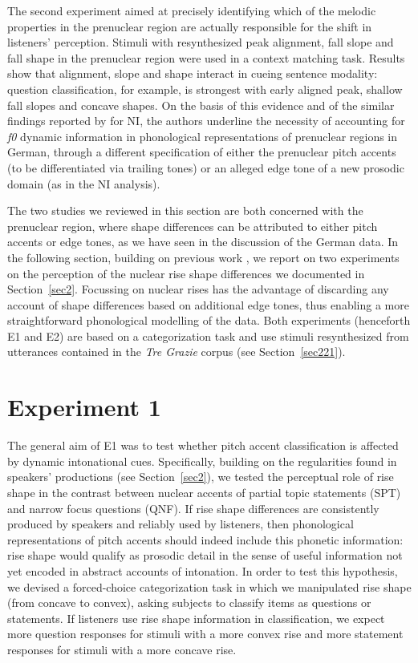 The second experiment aimed at precisely identifying which of the melodic properties in the prenuclear region are actually responsible for the shift in listeners' perception. Stimuli with resynthesized peak alignment, fall slope and fall shape in the prenuclear region were used in a context matching task. Results show that alignment, slope and shape interact in cueing sentence modality: question classification, for example, is strongest with early aligned peak, shallow fall slopes and concave shapes. On the basis of this evidence and of the similar findings reported by \citet{petrone2011tones} for NI, the authors underline the necessity of accounting for \textit{f0} dynamic information in phonological representations of prenuclear regions in German, through a different specification of either the prenuclear pitch accents (to be differentiated via trailing tones) or an alleged edge tone of a new prosodic domain (as in the NI analysis).

The two studies we reviewed in this section are both concerned with the prenuclear region, where shape differences can be attributed to either pitch accents or edge tones, as we have seen in the discussion of the German data. In the following section, building on previous work \citep{dimperio2009interplay}, we report on two experiments on the perception of the nuclear rise shape differences we documented in Section~\ref{sec2}. Focussing on nuclear rises has the advantage of discarding any account of shape differences based on additional edge tones, thus enabling a more straightforward phonological modelling of the data. Both experiments (henceforth E1 and E2) are based on a categorization task and use stimuli resynthesized from utterances contained in the \textit{Tre Grazie} corpus (see Section~\ref{sec221}).

\section{Experiment 1}\label{sec32}
The general aim of E1 was to test whether pitch accent classification is affected by dynamic intonational cues. Specifically, building on the regularities found in speakers' productions (see Section~\ref{sec2}), we tested the perceptual role of rise shape in the contrast between nuclear accents of partial topic statements (SPT) and narrow focus questions (QNF). If rise shape differences are consistently produced by speakers and reliably used by listeners, then phonological representations of pitch accents should indeed include this phonetic information: rise shape would qualify as prosodic detail in the sense of useful information not yet encoded in abstract accounts of intonation. In order to test this hypothesis, we devised a forced-choice categorization task in which we manipulated rise shape (from concave to convex), asking subjects to classify items as questions or statements. If listeners use rise shape information in classification, we expect more question responses for stimuli with a more convex rise and more statement responses for stimuli with a more concave rise.

